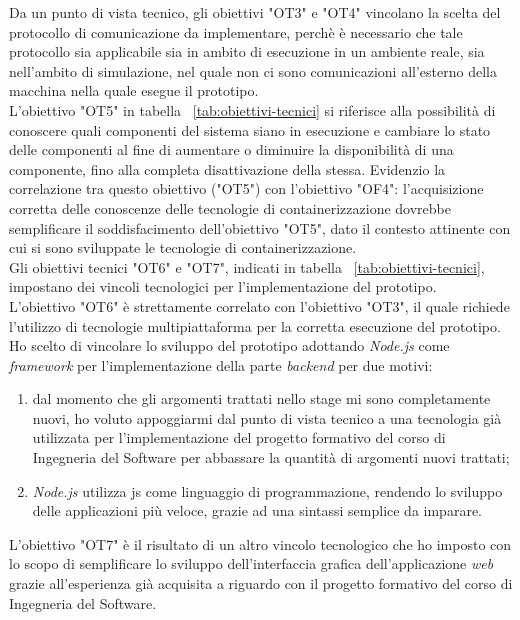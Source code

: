Da un punto di vista tecnico, gli obiettivi "OT3" e "OT4" vincolano la scelta del protocollo di comunicazione da implementare, perchè è necessario che tale protocollo sia applicabile sia in ambito di esecuzione in un ambiente reale, sia nell'ambito di simulazione, nel quale non ci sono comunicazioni all'esterno della macchina nella quale esegue il prototipo. \\
L'obiettivo "OT5" in tabella ~\ref{tab:obiettivi-tecnici} si riferisce alla possibilità di conoscere quali componenti del sistema siano in esecuzione e cambiare lo stato delle componenti al fine di aumentare o diminuire la disponibilità di una componente, fino alla completa disattivazione della stessa. Evidenzio la correlazione tra questo obiettivo ("OT5") con l'obiettivo "OF4": l'acquisizione corretta delle conoscenze delle tecnologie di containerizzazione dovrebbe semplificare il soddisfacimento dell'obiettivo "OT5", dato il contesto attinente con cui si sono sviluppate le tecnologie di containerizzazione. \\

Gli obiettivi tecnici "OT6" e "OT7", indicati in tabella ~\ref{tab:obiettivi-tecnici}, impostano dei vincoli tecnologici per l'implementazione del prototipo. \\
L'obiettivo "OT6" è strettamente correlato con l'obiettivo "OT3", il quale richiede l'utilizzo di tecnologie multipiattaforma per la corretta esecuzione del prototipo. Ho scelto di vincolare lo sviluppo del prototipo adottando \emph{Node.js} come \emph{framework} per l'implementazione della parte \emph{backend} per due motivi:
\begin{enumerate}
  \item dal momento che gli argomenti trattati nello stage mi sono completamente nuovi, ho voluto appoggiarmi dal punto di vista tecnico a una tecnologia già utilizzata per l'implementazione del progetto formativo del corso di Ingegneria del Software per abbassare la quantità di argomenti nuovi trattati;
  \item \emph{Node.js} utilizza \gls{js} come linguaggio di programmazione, rendendo lo sviluppo delle applicazioni più veloce, grazie ad una sintassi semplice da imparare.
\end{enumerate}
L'obiettivo "OT7" è il risultato di un altro vincolo tecnologico che ho imposto con lo scopo di semplificare lo sviluppo dell'interfaccia grafica dell'applicazione \emph{web} grazie all'esperienza già acquisita a riguardo con il progetto formativo del corso di Ingegneria del Software.

